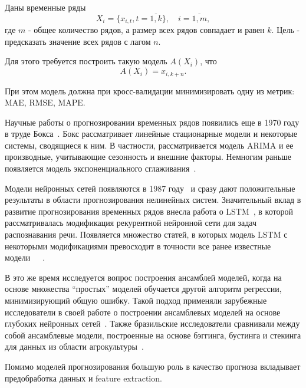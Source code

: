 \documentclass[a4paper,article,14pt]{extarticle}
\begin{document}
\pagebreak
{}

Даны временные ряды
\begin{equation}
    {X_{i} = \{x_{i,t}, t=\overline{1,k}\},\quad i=\overline{1,m}},\label{eq:equation}
\end{equation}
где $m$ - общее количество рядов, а размер всех рядов совпадает и равен $k$.
Цель - предсказать значение всех рядов с лагом $n$.

Для этого требуется построить такую модель $A(X_i)$, что
\begin{equation}
    A(X_i)=x_{i, k+n}.\label{eq:equation2}
\end{equation}

При этом модель должна при кросс-валидации минимизировать одну из метрик: MAE, RMSE, MAPE. %

\pagebreak
{}

Научные работы о прогнозировании временных рядов появились еще в 1970 году в труде Бокса~\cite{box}.
Бокс рассматривает линейные стационарные модели и некоторые системы, сводящиеся к ним.
В частности, рассматривается модель ARIMA и ее производные, учитывающие сезонность и внешние факторы.
Немногим раньше появляется модель экспоненциального сглаживания~\cite{expsmooth}.
\par
Модели нейронных сетей появляются в 1987 году~\cite{firstnn} и сразу дают положительные результаты в области прогнозирования нелинейных систем.
Значительный вклад в развитие прогнозирования временных рядов внесла работа о LSTM~\cite{lstm}, в которой рассматривалась модификация рекурентной нейронной сети для задач распознавания речи.
Появляется множество статей, в которых модель LSTM с некоторыми модификациями превосходит в точности все ранее известные модели~\cite{lstm_ex1}~\cite{lstm_ex2}~\cite{lstm_ex3}.
\par
В это же время исследуется вопрос построения ансамблей моделей, когда на основе множества ``простых'' моделей обучается другой алгоритм регрессии, минимизирующий общую ошибку.
Такой подход применяли зарубежные исследователи в своей работе о построении ансамблевых моделей на основе глубоких нейронных сетей~\cite{ensemble_dl}.
Также бразильские исследователи сравнивали между собой ансамблевые модели, построенные на основе бэггинга, бустинга и стекинга для данных из области агрокультуры~\cite{ensemble_agri}.
\par
Помимо моделей прогнозирования большую роль в качество прогноза вкладывает предобработка данных и feature extraction. %
\end{document}
